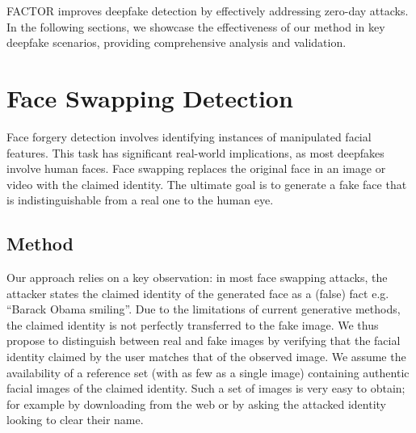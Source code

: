 \documentclass{article} \usepackage{iclr2024_conference,times}
\begin{document}
FACTOR improves deepfake detection by effectively addressing zero-day attacks. In the following sections, we showcase the effectiveness of our method in key deepfake scenarios, providing comprehensive analysis and validation.

\section{Face Swapping Detection}
\label{sec:identity}
Face forgery detection involves identifying instances of manipulated facial features. This task has significant real-world implications, as most deepfakes involve human faces. Face swapping replaces the original face in an image or video with the claimed identity. The ultimate goal is to generate a fake face that is indistinguishable from a real one to the human eye. 

\subsection{Method}
Our approach relies on a key observation: in most face swapping attacks, the attacker states the claimed identity of the generated face as a (false) fact e.g. “Barack Obama smiling”. Due to the limitations of current generative methods, the claimed identity is not perfectly transferred to the fake image. We thus propose to distinguish between real and fake images by verifying that the facial identity claimed by the user matches that of the observed image. We assume the availability of a reference set (with as few as a single image) containing authentic facial images of the claimed identity. Such a set of images is very easy to obtain; for example by downloading from the web or by asking the attacked identity looking to clear their name.
\end{document}
